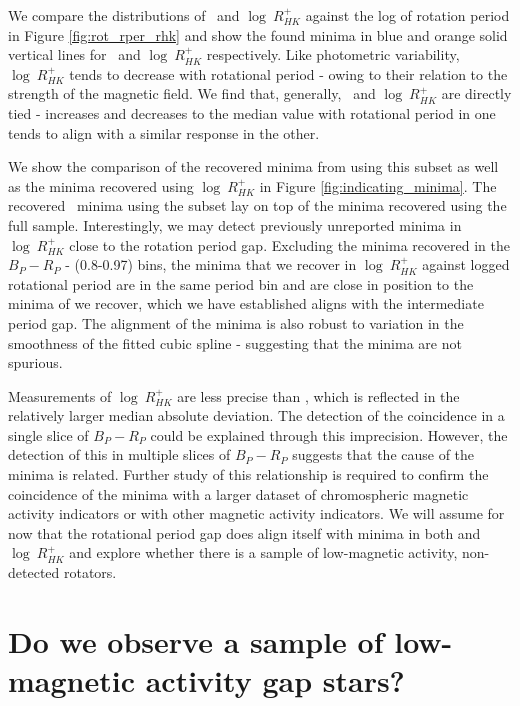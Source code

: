We compare the distributions of \rper{} \ and $\log \ R^{+}_{HK}$ against the log of rotation period in Figure \ref{fig:rot_rper_rhk} and show the found minima in blue and orange solid vertical lines for \rper{} \ and $\log \ R^{+}_{HK}$ respectively.
Like photometric variability, $\log \ R^{+}_{HK}$ tends to decrease with rotational period - owing to their relation to the strength of the magnetic field.
We find that, generally, \rper{} \ and $\log \ R^{+}_{HK}$ are directly tied - increases and decreases to the median value with rotational period in one tends to align with a similar response in the other.

We show the comparison of the recovered minima from \rper{} using this subset as well as the minima recovered using $\log \ R^{+}_{HK}$ in Figure \ref{fig:indicating_minima}.
The recovered \rper{} \ minima using the subset lay on top of the \rper{} minima recovered using the full sample.
Interestingly, we may detect previously unreported minima in $\log \ R^{+}_{HK}$ close to the rotation period gap.
Excluding the minima recovered in the $B_P-R_P$ - (0.8-0.97) bins, the minima that we recover in $\log \ R^{+}_{HK}$ against logged rotational period are in the same period bin and are close in position to the minima of \rper{} we recover, which we have established aligns with the intermediate period gap.
The alignment of the minima is also robust to variation in the smoothness of the fitted cubic spline - suggesting that the minima are not spurious.

Measurements of $\log \ R^{+}_{HK}$ are less precise than \rper{}, which is reflected in the relatively larger median absolute deviation.
The detection of the coincidence in a single slice of $B_P-R_P$ could be explained through this imprecision.
However, the detection of this in multiple slices of $B_P-R_P$ suggests that the cause of the minima is related.
Further study of this relationship is required to confirm the coincidence of the minima with a larger dataset of chromospheric magnetic activity indicators or with other magnetic activity indicators.
We will assume for now that the rotational period gap does align itself with minima in both \rper{} and $\log \ R^{+}_{HK}$ and explore whether there is a sample of low-magnetic activity, non-detected rotators.

\section{Do we observe a sample of low-magnetic activity gap stars?}
\label{sec:low_activity_gap}

